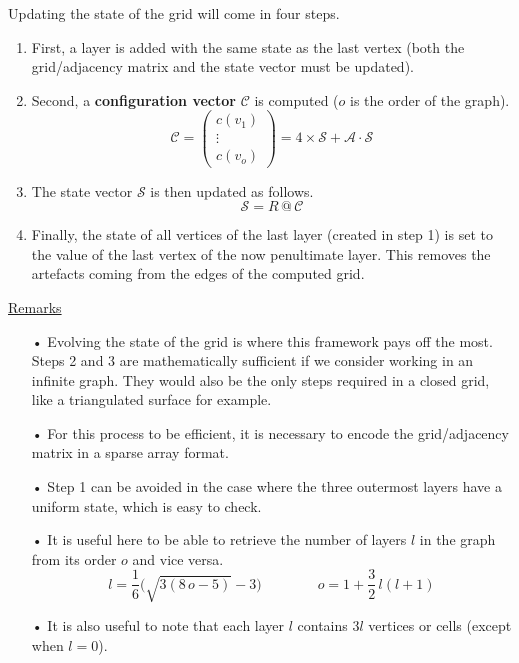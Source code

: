 \documentclass{article}
\begin{document}
\bigskip

\noindent Updating the state of the grid will come in four steps.
\begin{enumerate}
\item 
First, a layer is added with the same state as the last vertex (both the grid/adjacency matrix and the state vector must be updated).

\item 
Second, a \textbf{configuration vector} $\mathcal{C}$ is computed ($o$ is the order of the graph).
\begin{equation}
\mathcal{C}=
\begin{pmatrix} c(v_1) \\ \vdots \\ c(v_o) \end{pmatrix}
=4\times\mathcal{S}+\mathcal{A}\cdot\mathcal{S}
\end{equation}

\item 
The state vector $\mathcal{S}$ is then updated as follows.
\begin{equation}
    \mathcal{S}=R\,\text{@}\,\mathcal{C}
\end{equation}

\item 
Finally, the state of all vertices of the last layer (created in step 1) is set to the value of the last vertex of the now penultimate layer. This removes the artefacts coming from the edges of the computed grid. 
\end{enumerate}

\medskip

\underline{Remarks}
\begin{enumerate}
    \item[•] Evolving the state of the grid is where this framework pays off the most. Steps 2 and 3 are mathematically sufficient if we consider working in an infinite graph. They would also be the only steps required in a closed grid, like a triangulated surface \cite{zawidzkiApplicationSemitotalistic2D2011} for example.
    \item[•] For this process to be efficient, it is necessary to encode the grid/adjacency matrix in a sparse array format.
    \item[•] Step 1 can be avoided in the case where the three outermost layers have a uniform state, which is easy to check.
    \item[•] It is useful here to be able to retrieve the number of layers $l$ in the graph from its order $o$ and vice versa. 
    \begin{equation}
    l=\frac{1}{6}\Big(\sqrt{3(8\,o-5)}-3\Big)
    \qquad\qquad
    o=1+\frac{3}{2}\,l(l+1)
    \end{equation}
    \item[•] It is also useful to note that each layer $l$ contains $3l$ vertices or cells (except when $l=0$).
\end{enumerate}
\end{document}
